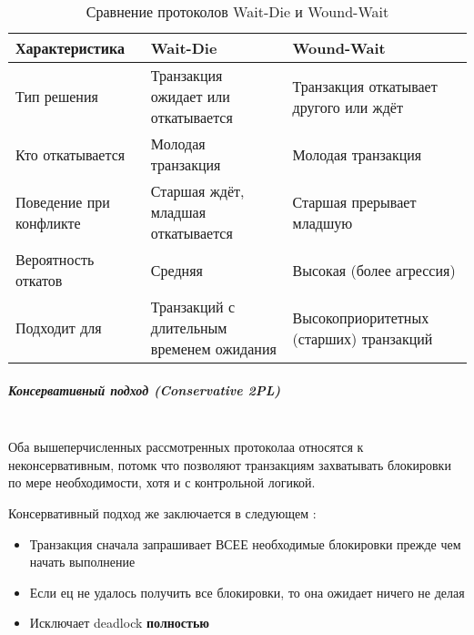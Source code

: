  \begin{table}[H]
     \centering
     \caption{Сравнение протоколов Wait-Die и Wound-Wait}
     \begin{tabular}{|l|p{5.25cm}|p{5.25cm}|}
         \hline
         \textbf{Характеристика} & \textbf{Wait-Die} & \textbf{Wound-Wait} \\
         \hline
         Тип решения & Транзакция ожидает или откатывается & Транзакция откатывает другого или ждёт \\
         \hline
         Кто откатывается & Молодая транзакция & Молодая транзакция \\
         \hline
         Поведение при конфликте & Старшая ждёт, младшая откатывается & Старшая прерывает младшую \\
         \hline
         Вероятность откатов & Средняя & Высокая (более агрессия) \\
         \hline
         Подходит для & Транзакций с длительным временем ожидания & Высокоприоритетных (старших) транзакций \\
         \hline
     \end{tabular}
 \end{table}
 
 \subparagraph{Консервативный подход (Conservative 2PL)} ~\\
 Оба вышеперчисленных рассмотренных протоколаа относятся к неконсервативным, потомк что позволяют транзакциям захватывать блокировки по мере необходимости, хотя и с контрольной логикой.
 
 Консервативный подход же заключается в следующем \autocite{Silberschatz, ElmasriNavathe}:
 \begin{itemize}
     \item Транзакция сначала запрашивает ВСЕЕ необходимые блокировки прежде чем начать выполнение
     \item Если ец не удалось получить все блокировки, то она ожидает ничего не делая
     \item Исключает deadlock \textbf{полностью}
 \end{itemize}
 
